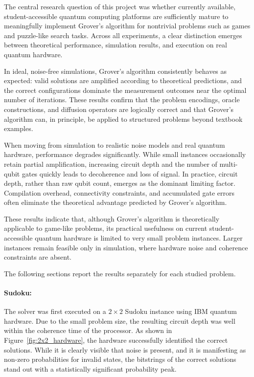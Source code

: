 The central research question of this project was whether currently available, student-accessible quantum computing platforms are sufficiently mature to meaningfully implement Grover’s algorithm for nontrivial problems such as games and puzzle-like search tasks. Across all experiments, a clear distinction emerges between theoretical performance, simulation results, and execution on real quantum hardware.

\vspace{1em}
\noindent
In ideal, noise-free simulations, Grover’s algorithm consistently behaves as expected: valid solutions are amplified according to theoretical predictions, and the correct configurations dominate the measurement outcomes near the optimal number of iterations. These results confirm that the problem encodings, oracle constructions, and diffusion operators are logically correct and that Grover’s algorithm can, in principle, be applied to structured problems beyond textbook examples.

\vspace{1em}
\noindent
When moving from simulation to realistic noise models and real quantum hardware, performance degrades significantly. While small instances occasionally retain partial amplification, increasing circuit depth and the number of multi-qubit gates quickly leads to decoherence and loss of signal. In practice, circuit depth, rather than raw qubit count, emerges as the dominant limiting factor. Compilation overhead, connectivity constraints, and accumulated gate errors often eliminate the theoretical advantage predicted by Grover’s algorithm.

\vspace{1em}
\noindent
These results indicate that, although Grover’s algorithm is theoretically applicable to game-like problems, its practical usefulness on current student-accessible quantum hardware is limited to very small problem instances. Larger instances remain feasible only in simulation, where hardware noise and coherence constraints are absent.

\vspace{1em}
\noindent
The following sections report the results separately for each studied problem.

\paragraph{Sudoku:}
The solver was first executed on a $2\times 2$ Sudoku instance using IBM quantum hardware. Due to the small problem size, the resulting circuit depth was well within the coherence time of the processor. As shown in Figure~\ref{fig:2x2_hardware}, the hardware successfully identified the correct solutions. While it is clearly visible that noise is present, and it is manifesting as non-zero probabilities for invalid states, the bitstrings of the correct solutions stand out with a statistically significant probability peak.

